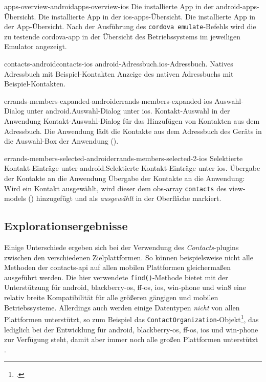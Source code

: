 	
	\pagebreak
	
	{apps-overview-android}{apps-overview-ios}
	{Die installierte App in der \gls{android}-\glspl{app}-Übersicht.}
	{Die installierte App in der \gls{ios}-\glspl{app}-Übersicht.}
	{Die installierte App in der App-Übersicht.}
	{Nach der Ausführung des \lstinline|cordova emulate|-Befehls wird die zu testende \gls{cordova}-\gls{app} in der Übersicht des Betriebssystems im jeweiligen Emulator angezeigt.}
	{\ownScreenshot}
	
	{contacts-android}{contacts-ios}
	{\gls{android}-Adressbuch.}{\gls{ios}-Adressbuch.}
	{Natives Adressbuch mit Beispiel-Kontakten}
	{Anzeige des nativen Adressbuchs mit Beispiel-Kontakten.}
	{\ownScreenshot}
	
	{errands-members-expanded-android}{errands-members-expanded-ios}
	{Auswahl-Dialog unter \gls{android}.}{Auswahl-Dialog unter \gls{ios}.}
	{Kontakt-Auswahl in der Anwendung}
	{Kontakt-Auswahl-Dialog für das Hinzufügen von Kontakten aus dem Adressbuch. Die Anwendung lädt die Kontakte aus dem Adressbuch des Geräts in die Auswahl-Box der Anwendung ().}
	{\ownScreenshot}
	
	{errands-members-selected-android}{errands-members-selected-2-ios}
	{Selektierte Kontakt-Einträge unter \gls{android}.}{Selektierte Kontakt-Einträge unter \gls{ios}.}
	{Übergabe der Kontakte an die Anwendung}
	{Übergabe der Kontakte an die Anwendung: Wird ein Kontakt ausgewählt, wird dieser dem \gls{obs}-\gls{array} \lstinline|contacts| des \glspl{view-model} () hinzugefügt und als \emph{ausgewählt} in der Oberfläche markiert.}
	{\ownScreenshot}
	
	\pagebreak
	
\subsection{Explorationsergebnisse} \label{sec:contacts-ergebnis}
Einige Unterschiede ergeben sich bei der Verwendung des \emph{Contacts}-\glspl{plugin} zwischen den verschiedenen Zielplattformen.
So können beispielsweise nicht alle Methoden der \gls{contacts-api} auf allen mobilen Plattformen gleichermaßen ausgeführt werden.
Die hier verwendete \lstinline|find()|-Methode bietet mit der Unterstützung für \gls{android}, \gls{blackberry-os}, \gls{ff-os}, \gls{ios}, \gls{win-phone} und \gls{win8} eine relativ  breite Kompatibilität für alle größeren gängigen und mobilen Betriebssysteme.
Allerdings auch werden einige Datentypen \emph{nicht} von allen Plattformen unterstützt, so zum Beispiel das \lstinline|ContactOrganization|-Objekt\footnote{.}, das lediglich bei der Entwicklung für \gls{android}, \gls{blackberry-os}, \gls{ff-os}, \gls{ios} und \gls{win-phone} zur Verfügung steht, damit aber immer noch alle großen Plattformen unterstützt \cite{Cordova_Plugin_Registry_Contacts}.


